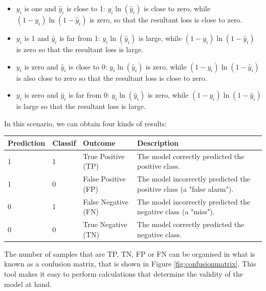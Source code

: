 \documentclass[conference]{IEEEtran}
\begin{document}
	\begin{itemize}
		\item $y_i$ is one and $\hat{y}_i$ is close to 1: $y_i \ln(\hat{y}_i)$ is close to zero, while $(1 - y_i) \ln(1 - \hat{y}_i)$ is zero, so that the resultant loss is close to zero.
		\item $y_i$ is 1 and $\hat{y}_i$ is far from 1: $y_i \ln(\hat{y}_i)$ is large, while $(1 - y_i) \ln(1 - \hat{y}_i)$ is zero so that the resultant loss is large.
		\item $y_i$ is zero and $\hat{y}_i$ is close to 0: $y_i \ln(\hat{y}_i)$ is zero, while $(1 - y_i) \ln(1 - \hat{y}_i)$ is also close to zero so that the resultant loss is close to zero.
		\item $y_i$ is zero and $\hat{y}_i$ is far from 0: $y_i \ln(\hat{y}_i)$ is zero, while $(1 - y_i) \ln(1 - \hat{y}_i)$ is large so that the resultant loss is large.
	\end{itemize}	
	
	In this scenario,  we can obtain four kinds of results:
	
	\begin{table}[!ht]
		\centering
		\begin{tabular}{|l|l|l|p{2cm}|}
			\hline
			Prediction & Classif & Outcome & Description \\ \hline
			1 & 1 & True Positive (TP) & The model correctly predicted the positive class. \\ \hline
			1 & 0 & False Positive (FP) & The model incorrectly predicted the positive class (a "false alarm"). \\ \hline
			0 & 1 & False Negative (FN) & The model incorrectly predicted the negative class (a "miss"). \\ \hline
			0 & 0 & True Negative (TN) & The model correctly predicted the negative class. \\ \hline
		\end{tabular}
	\end{table}

	The number of samples that are TP, TN, FP or FN can be organised in what is known as a confusion matrix, that is shown in Figure \ref{fig:confusionmatrix}. This tool makes it easy to perform calculations that determine the validity of the model at hand.
\end{document}
